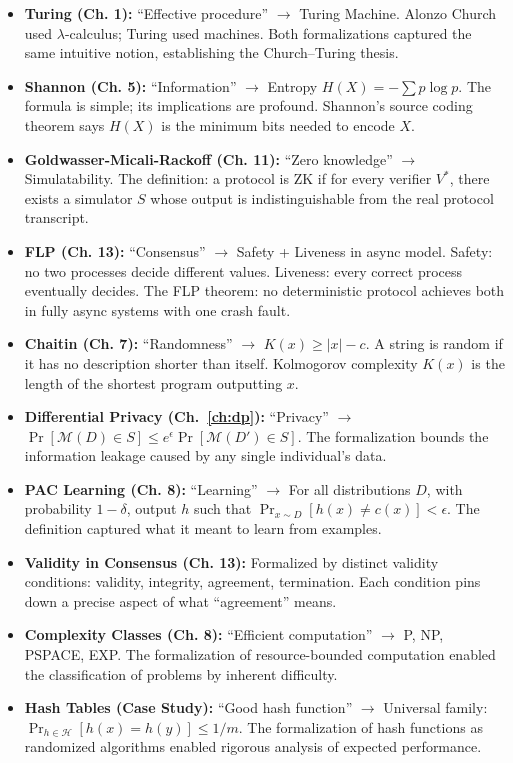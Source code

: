 \begin{itemize}
\item \textbf{Turing (Ch. 1):} ``Effective procedure'' $\to$ Turing Machine. Alonzo Church used $\lambda$-calculus; Turing used machines. Both formalizations captured the same intuitive notion, establishing the Church--Turing thesis.

\item \textbf{Shannon (Ch. 5):} ``Information'' $\to$ Entropy $H(X) = -\sum p \log p$. The formula is simple; its implications are profound. Shannon's source coding theorem says $H(X)$ is the minimum bits needed to encode $X$.

\item \textbf{Goldwasser-Micali-Rackoff (Ch. 11):} ``Zero knowledge'' $\to$ Simulatability. The definition: a protocol is ZK if for every verifier $V^*$, there exists a simulator $S$ whose output is indistinguishable from the real protocol transcript.

\item \textbf{FLP (Ch. 13):} ``Consensus'' $\to$ Safety + Liveness in async model. Safety: no two processes decide different values. Liveness: every correct process eventually decides. The FLP theorem: no deterministic protocol achieves both in fully async systems with one crash fault.

\item \textbf{Chaitin (Ch. 7):} ``Randomness'' $\to$ $K(x) \ge |x| - c$. A string is random if it has no description shorter than itself. Kolmogorov complexity $K(x)$ is the length of the shortest program outputting $x$.

\item \textbf{Differential Privacy (Ch.~\ref{ch:dp}):} ``Privacy'' $\to$ $\Pr[\mathcal{M}(D) \in S] \le e^\epsilon \Pr[\mathcal{M}(D') \in S]$. The formalization bounds the information leakage caused by any single individual's data.

\item \textbf{PAC Learning (Ch. 8):} ``Learning'' $\to$ For all distributions $D$, with probability $1-\delta$, output $h$ such that $\Pr_{x \sim D}[h(x) \neq c(x)] < \epsilon$. The definition captured what it meant to learn from examples.

\item \textbf{Validity in Consensus (Ch. 13):} Formalized by distinct validity conditions: validity, integrity, agreement, termination. Each condition pins down a precise aspect of what ``agreement'' means.

\item \textbf{Complexity Classes (Ch. 8):} ``Efficient computation'' $\to$ P, NP, PSPACE, EXP. The formalization of resource-bounded computation enabled the classification of problems by inherent difficulty.

\item \textbf{Hash Tables (Case Study):} ``Good hash function'' $\to$ Universal family: $\Pr_{h \in \mathcal{H}}[h(x) = h(y)] \le 1/m$. The formalization of hash functions as randomized algorithms enabled rigorous analysis of expected performance.
\end{itemize}


